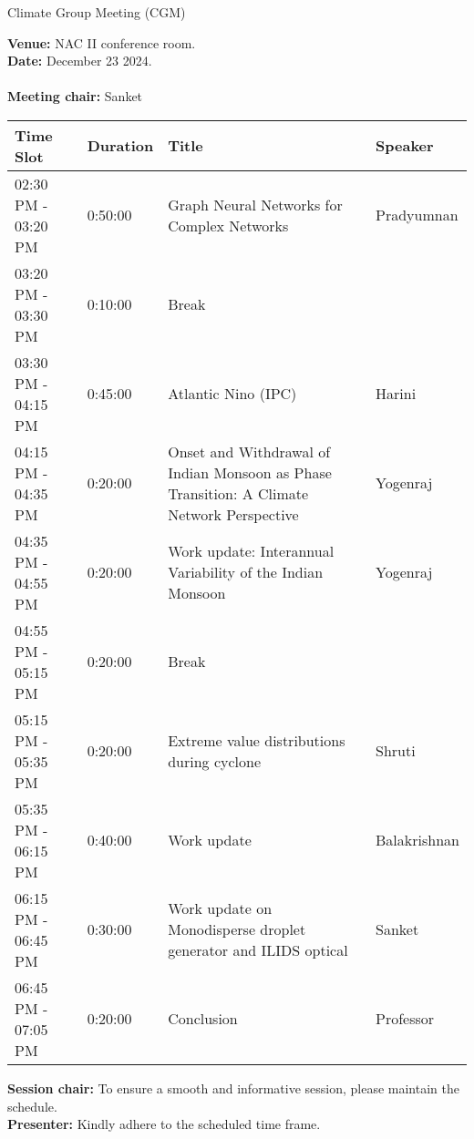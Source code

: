 \documentclass[12pt]{article}
\begin{document}
\begin{center}
    \fontsize{30}{30}\selectfont\intermedium Climate Group Meeting (CGM) \\ \bigskip
\end{center}
\hline
\vspace{1em}
\textbf{Venue:} NAC II conference room.\\
\textbf{Date:} December 23 2024.\\
\\
\textbf{Meeting chair:} Sanket
\vspace{0.5em}\\
\begin{center}
    \begin{tabular}{ |p{4.5cm}|p{2cm}|p{5.5cm}|p{3cm}|  }
 \hline
\textbf{Time Slot} & \textbf{Duration} & \textbf{Title} & \textbf{Speaker} \\
\hline
02:30 PM - 03:20 PM & 0:50:00 & Graph Neural Networks for Complex Networks & Pradyumnan\\
03:20 PM - 03:30 PM & 0:10:00 & Break &  \\
03:30 PM - 04:15 PM & 0:45:00 & Atlantic Nino (IPC) & Harini\\
04:15 PM - 04:35 PM & 0:20:00 & Onset and Withdrawal of Indian Monsoon as Phase Transition: A Climate Network Perspective & Yogenraj\\
04:35 PM - 04:55 PM & 0:20:00 & Work update: Interannual Variability of the Indian Monsoon & Yogenraj\\
04:55 PM - 05:15 PM & 0:20:00 & Break & \\
05:15 PM - 05:35 PM & 0:20:00 & Extreme value distributions during cyclone & Shruti\\
05:35 PM - 06:15 PM & 0:40:00 & Work update & Balakrishnan\\
06:15 PM - 06:45 PM & 0:30:00 & Work update on Monodisperse droplet generator and ILIDS optical & Sanket\\
06:45 PM - 07:05 PM & 0:20:00 & Conclusion & Professor\\
\hline
\end{tabular}
\end{center}
\vspace{1em}
\textbf{Session chair:}
To ensure a smooth and informative session, please maintain the schedule.
\\
\textbf{Presenter:}
Kindly adhere to the scheduled time frame. 
\end{document}
